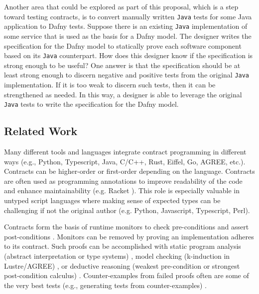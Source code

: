 \documentclass[11pt,onecolumn,notitlepage]{article}
\begin{document}
Another area that could be explored as part of this proposal, which is a step toward testing contracts, is to convert manually written \texttt{Java} tests for some Java application to Dafny tests. Suppose there is an existing \texttt{Java} implementation of some service that is used as the basis for a Dafny model. The designer writes the specification for the Dafny model to statically prove each software component based on its \texttt{Java} counterpart. How does this designer know if the specification is strong enough to be useful? One answer is that the specification should be at least strong enough to discern negative and positive tests from the original \texttt{Java} implementation. If it is too weak to discern such tests, then it can be strengthened as needed. In this way, a designer is able to leverage the original \texttt{Java} tests to write the specification for the Dafny model.
 
\subsection*{Related Work}

Many different tools and languages integrate contract programming in different ways (e.g., Python, Typescript, Java, C/C++, Rust, Eiffel, Go, AGREE, etc.). Contracts can be higher-order or first-order depending on the language. Contracts are often used as programming annotations to improve readability of the code and enhance maintainability (e.g. Racket \cite{10.1145/3022670.2951930,10.1145/583852.581484,10.1145/2034574.2034800}). This role is especially valuable in untyped script languages where making sense of expected types can be challenging if not the original author (e.g. Python, Javascript, Typescript, Perl). 

Contracts form the basis of runtime monitors to check pre-conditions and assert post-conditions \cite{10.1007/978-3-642-28869-2_11}. Monitors can be removed by proving an implementation adheres to its contract. Such proofs can be accomplished with static program analysis (abstract interpretation or type systems) \cite{10.1145/3158139}, model checking (k-induction in Lustre/AGREE) \cite{10.1007/978-3-642-23702-7_26,10.1007/978-3-319-96142-2_3, 10.1007/978-3-642-28891-3_13, 10.1007/3-540-48249-0_34, 10.1007/978-3-319-41540-6_29}, or deductive reasoning (weakest pre-condition or strongest post-condition calculus) \cite{10.1007/3-540-45314-8_21, Huisman2016, 10.1007/978-3-642-27705-4_7, DBLP:series/lncs/10001, 10.1007/978-3-030-03421-4_4}. Counter-examples from failed proofs often are some of the very best tests (e.g., generating tests from counter-examples) \cite{Billeter:Thesis:2008}.
\end{document}
